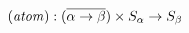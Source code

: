 \documentclass[preview]{standalone}
\begin{document}
\begin{equation*} (\mathit{atom}) : (\overline{\alpha \rightarrow \beta}) \times  S_{\alpha} \rightarrow S_{\beta} 
\end{equation*}
\end{document}
